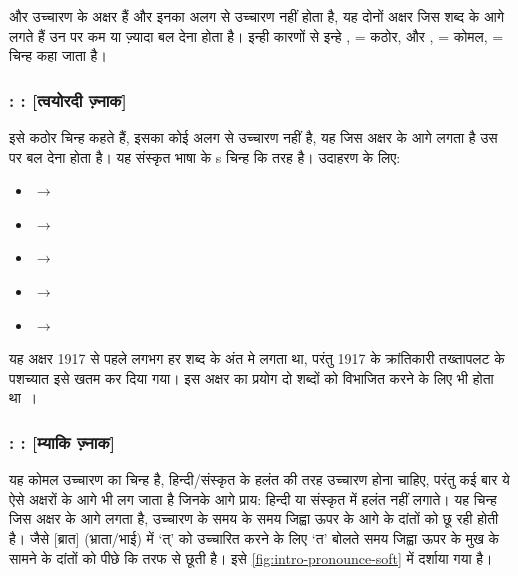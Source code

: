  और  उच्चारण के अक्षर हैं और इनका अलग से उच्चारण नहीं होता है, यह दोनों अक्षर जिस शब्द के आगे लगते हैं उन पर कम या ज़्यादा बल देना होता
है। इन्ही कारणों से इन्हे ,  = कठोर, और ,  = कोमल,  = चिन्ह कहा जाता है।

\subsubsection{: : [त्वयोरदी ज़्नाक]}\label{subsubsec:alpha-pronounce-special-char-hard}
इसे कठोर चिन्ह कहते हैं, इसका कोई अलग से उच्चारण नहीं है, यह जिस अक्षर के आगे लगता है उस पर बल देना होता है। यह संस्कृत भाषा के s चिन्ह कि तरह है। उदाहरण के लिए:
\begin{itemize}
    \item {} $\rightarrow$
    \item {} $\rightarrow$
    \item {} $\rightarrow$
    \item {} $\rightarrow$
    \item {} $\rightarrow$
\end{itemize}

यह अक्षर 1917 से पहले लगभग हर शब्द के अंत मे लगता था, परंतु 1917 के क्रांतिकारी तख्तापलट के पशच्यात इसे खतम कर दिया गया। इस अक्षर का प्रयोग दो शब्दों को विभाजित
करने के लिए भी होता था~\cite{guzeva2020}।


\subsubsection{: : [म्याकि ज़्नाक]}\label{subsubsec:alpha-pronounce-special-char-soft}
यह कोमल उच्चारण का चिन्ह है, हिन्दी/संस्कृत के हलंत की तरह उच्चारण होना चाहिए, परंतु कई बार ये ऐसे अक्षरों के आगे भी लग जाता है जिनके आगे प्राय: हिन्दी या संस्कृत में
हलंत नहीं लगाते। यह चिन्ह जिस अक्षर के आगे लगता है, उच्चारण के समय के समय जिह्वा ऊपर के आगे के दांतों को छू रही होती है। जैसे  [ब्रात] (भ्राता/भाई) में `त्'
को उच्चारित करने के लिए `त' बोलते समय जिह्वा ऊपर के मुख के सामने के दांतों को पीछे कि तरफ से छूती है। इसे \ref{fig:intro-pronounce-soft} में दर्शाया गया है।

